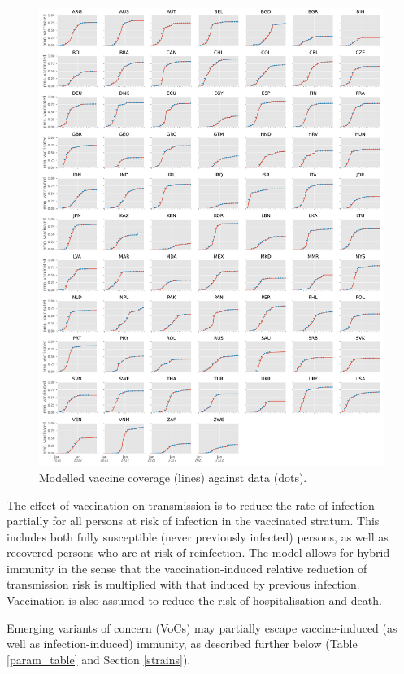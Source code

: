 \begin{figure}[h]
    \begin{center}
    \includegraphics[width=1.0\textwidth]{../../tex_descriptions/projects/sm_covid/vacc_coverage.pdf}
    \end{center}
    \caption{Modelled vaccine coverage (lines) against data (dots).
    } 
    \label{fig:vaccination}
\end{figure}

The effect of vaccination on transmission is to reduce the rate of infection partially for all persons at risk of infection in the vaccinated stratum.
This includes both fully susceptible (never previously infected) persons,
as well as recovered persons who are at risk of reinfection. The model allows for hybrid immunity
in the sense that the vaccination-induced relative reduction of transmission risk is multiplied with that induced by previous infection. Vaccination is also assumed to reduce the risk of hospitalisation and death. 

Emerging variants of concern (VoCs) may partially escape vaccine-induced (as well as infection-induced) immunity, as described further below (Table \ref{param_table} and Section \ref{strains}).